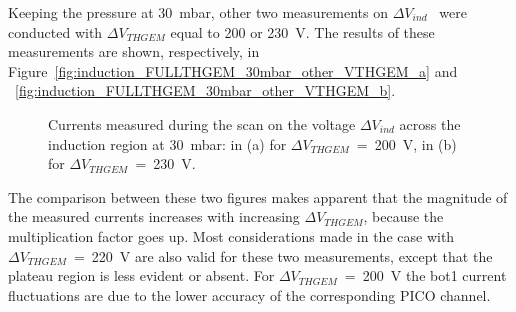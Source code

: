 \documentclass[a4paper, 11 pt]{article}
\newcommand{\Vind}{$\Delta V_{ind}$}
\newcommand{\Vthgem}{$\Delta V_{THGEM}$}
\begin{document}
Keeping the pressure at 30~mbar, other two measurements on \Vind~{} were conducted with \Vthgem{} equal to 200 or 230~V.
The results of these measurements are shown, respectively, in Figure~\ref{fig:induction_FULLTHGEM_30mbar_other_VTHGEM_a} and ~\ref{fig:induction_FULLTHGEM_30mbar_other_VTHGEM_b}.
\begin{figure}[!htb]
	\centering
	\caption{Currents measured during the scan on the voltage \Vind{} across the induction region at 30~mbar: in (a) for \Vthgem~=~200~V, in (b) for \Vthgem~=~230~V.}
	\label{fig:induction_FULLTHGEM_30mbar_other_VTHGEM}
\end{figure}
The comparison between these two figures makes apparent that the magnitude of the measured currents increases with increasing \Vthgem, because the multiplication factor goes up.
Most considerations made in the case with \Vthgem~=~220~V are also valid for these two measurements, except that the plateau region is less evident or absent.
For \Vthgem~=~200~V the bot1 current fluctuations are due to the lower accuracy of the corresponding PICO channel.
\end{document}

